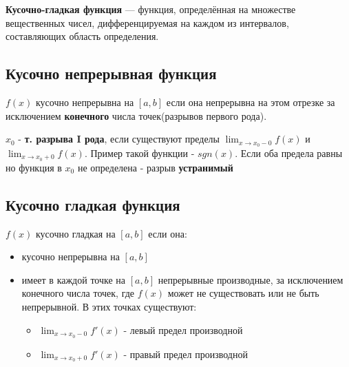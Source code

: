 \textbf{Кусочно-гладкая функция} — функция, определённая на множестве вещественных чисел, дифференцируемая на каждом из интервалов, составляющих область определения.

\subsection{Кусочно непрерывная функция}

$f(x)$ кусочно непрерывна на $[a,b]$ если она непрерывна на этом отрезке за исключением \textbf{конечного} числа точек(разрывов первого рода).

$x_0$ - \textbf{т. разрыва I рода}, если существуют пределы $\lim_{x\to x_0-0}f(x)$ и $\lim_{x\to x_0+0}f(x)$. Пример такой функции - $sgn(x)$. Если оба предела равны но функция в $x_0$ не определена - разрыв \textbf{устранимый}

\subsection{Кусочно гладкая функция}

$f(x)$ кусочно гладкая на $[a,b]$ если она:
\begin{itemize}
  \item кусочно непрерывна на $[a,b]$
  \item имеет в каждой точке на $[a,b]$ непрерывные производные, за исключением конечного числа точек, где $f(x)$ может не существовать или не быть непрерывной. В этих точках существуют:
  \begin{itemize}
    \item $\lim_{x\to x_0-0}f'(x)$ - левый предел производной
    \item $\lim_{x\to x_0+0}f'(x)$ - правый предел производной
  \end{itemize}
\end{itemize}





